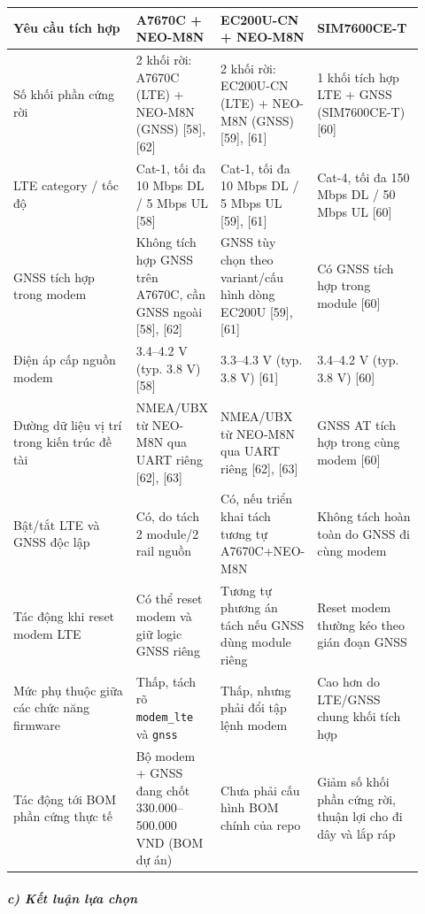 \documentclass[13pt,a4paper]{extarticle}
\newcounter{none} %
\newcommand{\thesislongtableorignewline}{}
\let\thesislongtableorignewline\\
\renewcommand{\\}{\thesislongtableorignewline\hline}%
\let\\\thesislongtableorignewline
\begin{document}
{\def\LTcaptype{none} %
\begin{longtable}{|p{0.30\linewidth}|p{0.16\linewidth}|p{0.20\linewidth}|p{0.26\linewidth}|}
\hline \textbf{Yêu cầu tích hợp} & \textbf{A7670C + NEO-M8N} & \textbf{EC200U-CN + NEO-M8N} & \textbf{SIM7600CE-T} \\
\hline
\endhead
\hline
\endlastfoot
Số khối phần cứng rời & 2 khối rời: A7670C (LTE) + NEO-M8N (GNSS)
{[}58{]}, {[}62{]} & 2 khối rời: EC200U-CN (LTE) + NEO-M8N (GNSS)
{[}59{]}, {[}61{]} & 1 khối tích hợp LTE + GNSS (SIM7600CE-T) {[}60{]} \\
LTE category / tốc độ & Cat-1, tối đa 10 Mbps DL / 5 Mbps UL {[}58{]} &
Cat-1, tối đa 10 Mbps DL / 5 Mbps UL {[}59{]}, {[}61{]} & Cat-4, tối đa
150 Mbps DL / 50 Mbps UL {[}60{]} \\
GNSS tích hợp trong modem & Không tích hợp GNSS trên A7670C, cần GNSS
ngoài {[}58{]}, {[}62{]} & GNSS tùy chọn theo variant/cấu hình dòng
EC200U {[}59{]}, {[}61{]} & Có GNSS tích hợp trong module {[}60{]} \\
Điện áp cấp nguồn modem & 3.4--4.2 V (typ. 3.8 V) {[}58{]} & 3.3--4.3 V
(typ. 3.8 V) {[}61{]} & 3.4--4.2 V (typ. 3.8 V) {[}60{]} \\
Đường dữ liệu vị trí trong kiến trúc đề tài & NMEA/UBX từ NEO-M8N qua
UART riêng {[}62{]}, {[}63{]} & NMEA/UBX từ NEO-M8N qua UART riêng
{[}62{]}, {[}63{]} & GNSS AT tích hợp trong cùng modem {[}60{]} \\
Bật/tắt LTE và GNSS độc lập & Có, do tách 2 module/2 rail nguồn & Có,
nếu triển khai tách tương tự A7670C+NEO-M8N & Không tách hoàn toàn do
GNSS đi cùng modem \\
Tác động khi reset modem LTE & Có thể reset modem và giữ logic GNSS
riêng & Tương tự phương án tách nếu GNSS dùng module riêng & Reset modem
thường kéo theo gián đoạn GNSS \\
Mức phụ thuộc giữa các chức năng firmware & Thấp, tách rõ
\texttt{modem\_lte} và \texttt{gnss} & Thấp, nhưng phải đổi tập lệnh
modem & Cao hơn do LTE/GNSS chung khối tích hợp \\
Tác động tới BOM phần cứng thực tế & Bộ modem + GNSS đang chốt
330.000--500.000 VND (BOM dự án) & Chưa phải cấu hình BOM chính của repo
& Giảm số khối phần cứng rời, thuận lợi cho đi dây và lắp ráp \\
\end{longtable}
}

\subparagraph{c) Kết luận lựa
chọn}\label{c-kux1ebft-luux1eadn-lux1ef1a-chux1ecdn}
\end{document}
